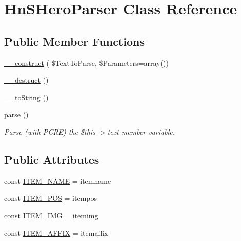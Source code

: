 \hypertarget{class_hn_s_hero_parser}{}\section{Hn\+S\+Hero\+Parser Class Reference}
\label{class_hn_s_hero_parser}
\subsection*{Public Member Functions}
\begin{DoxyCompactItemize}
\item 
\hyperlink{class_hn_s_hero_parser_abaa66274b27ad652c5cc1ec9664d6c87}{\+\_\+\+\_\+construct} ( \$Text\+To\+Parse, \$Parameters=array())
\item 
\hyperlink{class_hn_s_hero_parser_a96e12afd4df5dcd65c55348a0c9a60e4}{\+\_\+\+\_\+destruct} ()
\item 
\hyperlink{class_hn_s_hero_parser_a6f55841b332636c1abc3894a326b3181}{\+\_\+\+\_\+to\+String} ()
\item 
\hyperlink{class_hn_s_hero_parser_afe4a29be403c12f8b5e2e7e0c962953a}{parse} ()
\begin{DoxyCompactList}\small\item\em Parse (with P\+C\+RE) the \$this-\/$>$text member variable. \end{DoxyCompactList}\end{DoxyCompactItemize}
\subsection*{Public Attributes}
\begin{DoxyCompactItemize}
\item 
const \hyperlink{class_hn_s_hero_parser_a7e8f1a62dc0b4c66d3021b04b0407893}{I\+T\+E\+M\+\_\+\+N\+A\+ME} = \textquotesingle{}itemname\textquotesingle{}
\item 
const \hyperlink{class_hn_s_hero_parser_aec4e7d8783aeedcbe16baebb37e8ad3a}{I\+T\+E\+M\+\_\+\+P\+OS} = \textquotesingle{}itempos\textquotesingle{}
\item 
const \hyperlink{class_hn_s_hero_parser_ac82fee41e18b6b12f5c14e1ee054bd3f}{I\+T\+E\+M\+\_\+\+I\+MG} = \textquotesingle{}itemimg\textquotesingle{}
\item 
const \hyperlink{class_hn_s_hero_parser_a20fb93b9f6d4c9a0195fe9f277a72a31}{I\+T\+E\+M\+\_\+\+A\+F\+F\+IX} = \textquotesingle{}itemaffix\textquotesingle{}
\end{DoxyCompactItemize}
